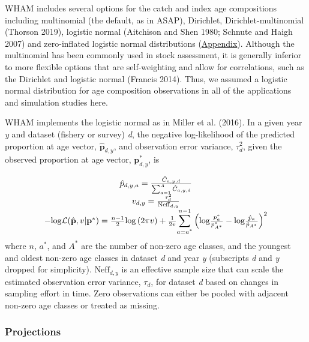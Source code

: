\documentclass[]{article}
\begin{document}
WHAM includes several options for the catch and index age compositions
including multinomial (the default, as in ASAP), Dirichlet,
Dirichlet-multinomial (Thorson 2019), logistic normal (Aitchison and
Shen 1980; Schnute and Haigh 2007) and zero-inflated logistic normal
distributions (\protect\hyperlink{appendix}{Appendix}). Although the
multinomial has been commonly used in stock assessment, it is generally
inferior to more flexible options that are self-weighting and allow for
correlations, such as the Dirichlet and logistic normal (Francis 2014).
Thus, we assumed a logistic normal distribution for age composition
observations in all of the applications and simulation studies here.

WHAM implements the logistic normal as in Miller et al. (2016). In a
given year \emph{y} and dataset (fishery or survey) \emph{d}, the
negative log-likelihood of the predicted proportion at age vector,
\(\hat{\mathbf{p}}_{d,y}\), and observation error variance,
\(\tau^2_d\), given the observed proportion at age vector,
\(\mathbf{p}^*_{d,y}\), is

\begin{equation}
  \begin{array}{ccc}
    \hat{p}_{d,y,a} = \frac{\hat{C}_{a,y,d}}{\sum_{a=1}^{A} \hat{C}_{a,y,d}}\\
    v_{d,y} = \frac{\tau^2_d}{\mathrm{Neff}_{d,y}} \\
    -\mathrm{log}\mathcal{L}(\hat{\mathbf{p}},v|\mathbf{p}^{*}) = \frac{n-1}{2}\mathrm{log}\left(2\pi v\right) + \frac{1}{2v} \mathlarger{\sum}_{a=a^{*}}^{n-1} \left(\mathrm{log} \frac{p^{*}_{a}}{p^{*}_{A^{*}}} - \mathrm{log} \frac{\hat{p}_{a}}{\hat{p}_{A^{*}}}\right)^2
  \end{array}
\end{equation} where \(n\), \(a^{*}\), and \(A^{*}\) are the number of
non-zero age classes, and the youngest and oldest non-zero age classes
in dataset \emph{d} and year \emph{y} (subscripts \emph{d} and \emph{y}
dropped for simplicity). \(\mathrm{Neff}_{d,y}\) is an effective sample
size that can scale the estimated observation error variance,
\(\tau_d\), for dataset \emph{d} based on changes in sampling effort in
time. Zero observations can either be pooled with adjacent non-zero age
classes or treated as missing.

\hypertarget{projections}{%
\subsubsection{Projections}\label{projections}}
\end{document}
